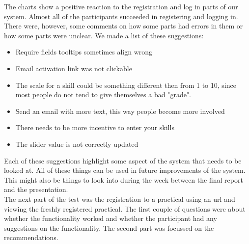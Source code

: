 The charts show a positive reaction to the registration and log in parts of our system.
Almost all of the participants succeeded in registering and logging in.\\
There were, however, some comments on how some parts had errors in them or how some parts were unclear. We made a list of these suggestions:
\begin{itemize}
\item Require fields tooltips sometimes align wrong
\item Email activation link was not clickable
\item The scale for a skill could be something different then from 1 to 10, since most people do not tend to give themselves a bad "grade".
\item Send an email with more text, this way people become more involved
\item There needs to be more incentive to enter your skills
\item The slider value is not correctly updated
\end{itemize}

Each of these suggestions highlight some aspect of the system that needs to be looked at.
All of these things can be used in future improvements of the system.
This might also be things to look into during the week between the final report and the presentation.\\

The next part of the test was the registration to a practical using an url and viewing the freshly registered practical.
The first couple of questions were about whether the functionality worked and whether the participant had any suggestions on the functionality.
The second part was focussed on the recommendations.\\

